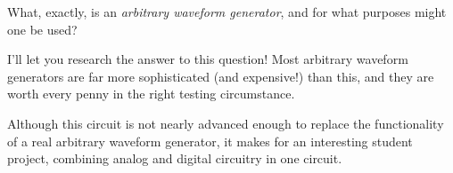 

What, exactly, is an {\it arbitrary waveform generator}, and for what purposes might one be used?







I'll let you research the answer to this question!  Most arbitrary waveform generators are far more sophisticated (and expensive!) than this, and they are worth every penny in the right testing circumstance.







Although this circuit is not nearly advanced enough to replace the functionality of a real arbitrary waveform generator, it makes for an interesting student project, combining analog and digital circuitry in one circuit.



